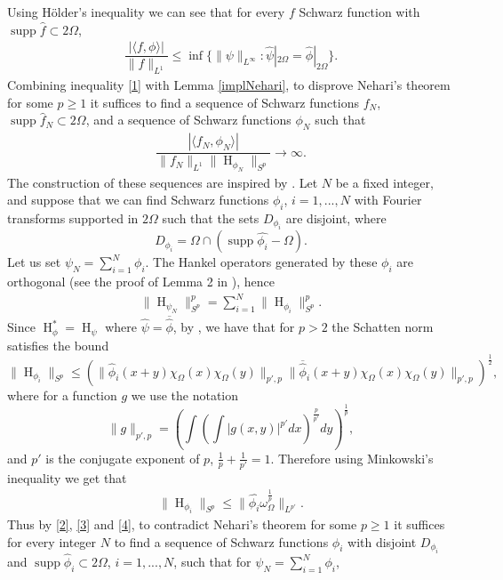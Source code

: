 \documentclass[footinclude=true]{amsart}
\theoremstyle{plain}
\DeclareMathOperator{\Ha}{H}
\DeclareMathOperator{\supp}{supp}
\begin{document}
	Using H\"{o}lder's inequality we can see that for every $f$ Schwarz function with $\supp\widehat{f}\subset 2\Omega$, 
	\begin{eqnarray}\label{1}
		\dfrac{|\langle f,\phi\rangle|}{\|f\|_{L^{1}}}\leq \inf\{\|\psi\|_{L^{\infty}}:\widehat{\psi}|_{2\Omega}=\widehat{\phi}|_{2\Omega}\}.
	\end{eqnarray}
	Combining inequality \eqref{1} with Lemma \ref{implNehari}, to disprove Nehari's theorem for some $p\geq 1$ it suffices to find a sequence of Schwarz functions $f_{N}$, $\supp\widehat{f}_{N}\subset 2\Omega$, and a sequence of Schwarz functions $\phi_{N}$ such that 
	\begin{eqnarray}\label{2}
		\dfrac{|\langle f_{N},\phi_{N}\rangle|}{\|f_{N}\|_{L^{1}}\|\Ha_{\phi_{N}}\|_{S^{p}}}\to \infty.
	\end{eqnarray}
	The construction of these sequences are inspired by \cite{MR4502777}. Let $N$ be a fixed integer, and suppose that we can find Schwarz functions $\phi_{i}$, $i=1,...,N$ with Fourier transforms supported in $2\Omega$ such that the sets $D_{\phi_{i}}$ are disjoint, where 
	$$D_{\phi_{i}}=\Omega\cap(\supp\widehat{\phi_{i}}-\Omega).$$ 
	Let us set $\psi_{N}=\sum_{i=1}^{N}\phi_{i}$. The Hankel operators generated by these $\phi_{i}$ are orthogonal (see the proof of Lemma 2 in \cite{MR4700194}), hence \begin{eqnarray}\label{3}
		\|\Ha_{\psi_{N}}\|^{p}_{S^{p}}=\sum_{i=1}^{N}\|\Ha_{\phi_{i}}\|^{p}_{S^{p}}.
	\end{eqnarray}
	Since $\Ha_{\phi}^{\ast}=\Ha_{\psi}$ where $\widehat{\psi}=\overline{\widehat{\phi}}$, by \cite[Theorem 1]{MR500308}, we have that for $p>2$ the Schatten norm satisfies the bound $$\|\Ha_{\phi_{i}}\|_{S^{p}}\leq (\|\widehat{\phi}_{i}(x+y)\chi_{\Omega}(x)\chi_{\Omega}(y)\|_{p',p}\|\overline{\widehat{\phi}}_{i}(x+y)\chi_{\Omega}(x)\chi_{\Omega}(y)\|_{p',p})^{\frac{1}{2}},$$ 
	where for a function $g$ we use the notation
	$$\|g\|_{p',p}=\left(\int\left(\int |g(x,y)|^{p'}dx\right)^{\frac{p}{p'}}dy\right)^{\frac{1}{p}},$$ and $p'$ is the conjugate exponent of $p$, $\frac{1}{p}+\frac{1}{p'}=1$.
	Therefore using Minkowski's inequality we get that 
	\begin{eqnarray}\label{4}
		\|\Ha_{\phi_{i}}\|_{S^{p}}\leq \|\widehat{\phi_{i}}\omega_{\Omega}^{\frac{1}{p}}\|_{L^{p'}}.
	\end{eqnarray}
	Thus by \eqref {2}, \eqref{3} and \eqref{4}, to contradict Nehari's theorem for some $p\geq 1$ it suffices for every integer $N$ to find a sequence of Schwarz functions $\phi_{i}$ with disjoint $D_{\phi_{i}}$ and $\supp\widehat{\phi}_{i}\subset 2\Omega$, $i=1,...,N$, such that for $\psi_{N}=\sum_{i=1}^{N}\phi_{i}$,
\end{document}
